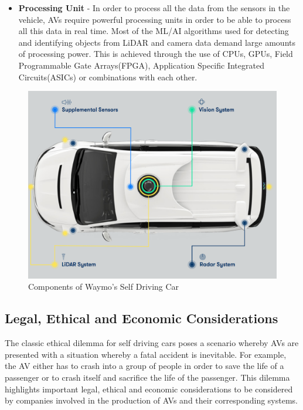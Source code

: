 \begin{itemize}
	\item \textbf{Processing Unit} - In order to process all the data from the sensors in the vehicle, AVs require powerful processing units in order to be able to process all this data in real time. Most of the ML/AI algorithms used for detecting and identifying objects from LiDAR and camera data demand large amounts of processing power. This is achieved through the use of CPUs, GPUs, Field Programmable Gate Arrays(FPGA)\cite{brown2012field}, Application Specific Integrated Circuits(ASICs)\cite{smith1997application} or combinations with each other. 

\end{itemize}


\begin{figure}[t]
	\centering
	\includegraphics[width=\textwidth]{media/waymo.png}
	\caption{Components of Waymo's Self Driving Car \cite{waymo_2018}}
	\label{fig:my_label}
\end{figure}



\subsection{Legal, Ethical and Economic Considerations}

The classic ethical dilemma for self driving cars poses a scenario whereby AVs are presented with a situation whereby a fatal accident is inevitable. For example, the AV either has to crash into a group of people in order to save the life of a passenger or to crash itself and sacrifice the life of the passenger. This dilemma highlights important legal, ethical and economic considerations to be considered by companies involved in the production of AVs and their corresponding systems. 


